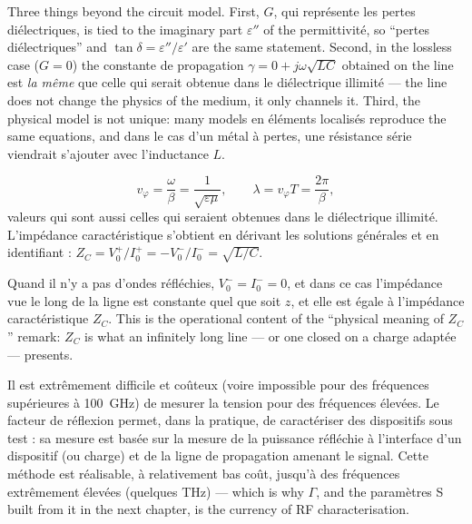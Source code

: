 \begin{remark}
  Three things beyond the circuit model. First, $G$, qui représente les pertes
  diélectriques, is tied to the imaginary part $\varepsilon''$ of the
  permittivité, so ``pertes diélectriques'' and
  $\tan\delta = \varepsilon''/\varepsilon'$ are the same statement. Second, in
  the lossless case ($G=0$) the constante de propagation
  $\gamma = 0 + j\omega\sqrt{LC}$ obtained on the line est \emph{la même} que
  celle qui serait obtenue dans le diélectrique illimité --- the line does not
  change the physics of the medium, it only channels it. Third, the physical
  model is not unique: many models en éléments localisés reproduce the same
  equations, and dans le cas d'un métal à pertes, une résistance série
  viendrait s'ajouter avec l'inductance $L$.
\end{remark}

\begin{prop}
  \[
    v_\varphi = \frac{\omega}{\beta} = \frac{1}{\sqrt{\varepsilon\mu}},
    \qquad
    \lambda = v_\varphi T = \frac{2\pi}{\beta},
  \]
  valeurs qui sont aussi celles qui seraient obtenues dans le diélectrique
  illimité. L'impédance caractéristique s'obtient en dérivant les solutions
  générales et en identifiant :
  $Z_C = V_0^{+}/I_0^{+} = -V_0^{-}/I_0^{-} = \sqrt{L/C}$.
\end{prop}

\begin{remark}
  Quand il n'y a pas d'ondes réfléchies, $V_0^{-} = I_0^{-} = 0$, et dans ce
  cas l'impédance vue le long de la ligne est constante quel que soit $z$, et
  elle est égale à l'impédance caractéristique $Z_C$. This is the operational
  content of the ``physical meaning of $Z_C$'' remark: $Z_C$ is what an
  infinitely long line --- or one closed on a charge adaptée --- presents.
\end{remark}

\begin{remark}
  Il est extrêmement difficile et coûteux (voire impossible pour des fréquences
  supérieures à 100~GHz) de mesurer la tension pour des fréquences élevées. Le
  facteur de réflexion permet, dans la pratique, de caractériser des
  dispositifs sous test : sa mesure est basée sur la mesure de la puissance
  réfléchie à l'interface d'un dispositif (ou charge) et de la ligne de
  propagation amenant le signal. Cette méthode est réalisable, à relativement
  bas coût, jusqu'à des fréquences extrêmement élevées (quelques THz) --- which
  is why $\Gamma$, and the paramètres S built from it in the next chapter, is
  the currency of RF characterisation.
\end{remark}
